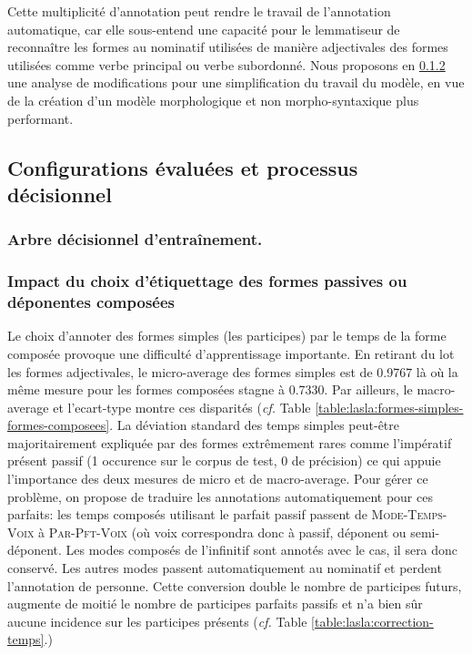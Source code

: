 Cette multiplicité d'annotation peut rendre le travail de l'annotation automatique, car elle sous-entend une capacité pour le lemmatiseur de reconnaître les formes au nominatif utilisées de manière adjectivales des formes utilisées comme verbe principal ou verbe subordonné. Nous proposons en \ref{subsec:training:lasla-modification} une analyse de modifications pour une simplification du travail du modèle, en vue de la création d'un modèle morphologique et non morpho-syntaxique plus performant.

\subsection{Configurations évaluées et processus décisionnel}

\subsubsection{Arbre décisionnel d'entraînement.}

\subsubsection{Impact du choix d'étiquettage des formes passives ou déponentes composées}
\label{subsec:training:lasla-modification}

Le choix d'annoter des formes simples (les participes) par le temps de la forme composée provoque une difficulté d'apprentissage importante. En retirant du lot les formes adjectivales, le \gls{micro-average} des formes simples est de 0.9767 là où la même mesure pour les formes composées stagne à 0.7330. Par ailleurs, le \gls{macro-average} et l'\gls{ecart-type} montre ces disparités (\textit{cf.} Table \ref{table:lasla:formes-simples-formes-composees}. La déviation standard des temps simples peut-être majoritairement expliquée par des formes extrêmement rares comme l'impératif présent passif (1 occurence sur le corpus de test, 0 de précision) ce qui appuie l'importance des deux mesures de micro et de macro-average. Pour gérer ce problème, on propose de traduire les annotations automatiquement pour ces parfaits: les temps composés utilisant le parfait passif passent de \textsc{Mode-Temps-Voix} à \textsc{Par-Pft-Voix} (où voix correspondra donc à passif, déponent ou semi-déponent. Les modes composés de l'infinitif sont annotés avec le cas, il sera donc conservé. Les autres modes passent automatiquement au nominatif et perdent l'annotation de personne. Cette conversion double le nombre de participes futurs, augmente de moitié le nombre de participes parfaits passifs et n'a bien sûr aucune incidence sur les participes présents (\textit{cf.} Table \ref{table:lasla:correction-temps}.)

